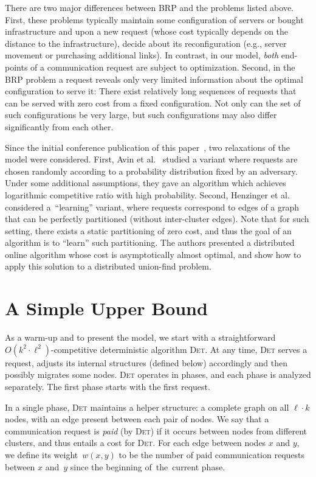 \documentclass{siamart190516}
\newcommand{\DET}{\textsc{Det}\xspace}
\begin{document}
There are two major differences between BRP and the problems listed above.
First, these problems typically maintain some configuration of servers or
bought infrastructure and upon a new request (whose cost typically depends on
the distance to the infrastructure), decide about its reconfiguration (e.g.,
server movement or purchasing additional links). In contrast, in our model,
\emph{both} end-points of a communication request are subject to optimization.
Second, in the BRP problem a request reveals only very limited information
about the optimal configuration to serve it: There exist relatively long
sequences of requests that can be served with zero cost from a fixed
configuration. Not only can the set of such configurations be very large, but
such configurations may also differ significantly from each other.

Since the initial conference publication of this paper~\cite{disc16}, two
relaxations of the model were considered. First, Avin et al.~\cite{computing18}
studied a variant where requests are chosen randomly according to a probability
distribution fixed by an adversary. Under some additional assumptions, they gave
an algorithm which achieves logarithmic competitive ratio with high probability.
Second, Henzinger et al.~\cite{sigmetrics19learn} considered a~``learning''
variant, where requests correspond to edges of a graph that can be perfectly
partitioned (without inter-cluster edges). Note that for such setting, there
exists a static partitioning of zero cost, and thus the goal of an algorithm is
to ``learn'' such partitioning. The authors presented a distributed online
algorithm whose cost is asymptotically almost optimal, and show how to apply
this solution to a distributed union-find problem. 




\section{A Simple Upper Bound}
\label{sec:upper}

As a warm-up and to present the model, we start with a straightforward $O(k^2
\cdot \ell^2)$-competitive deterministic algorithm \DET. At any time, \DET
serves a request, adjusts its internal structures (defined below)
accordingly and then possibly migrates some nodes. \DET operates in phases, and each
phase is analyzed separately. The first phase starts with the first request.

In a single phase, \DET maintains a helper structure: a complete graph on all
$\ell \cdot k$ nodes, with an edge present between each pair of nodes. We say
that a communication request is \emph{paid} (by \DET) if it occurs between
nodes from different clusters, and thus entails a cost for \DET. For each edge
between nodes $x$ and $y$, we define its weight~$w(x,y)$ to be the number of
paid communication requests between $x$ and~$y$ since the beginning of~the~current phase.
\end{document}
